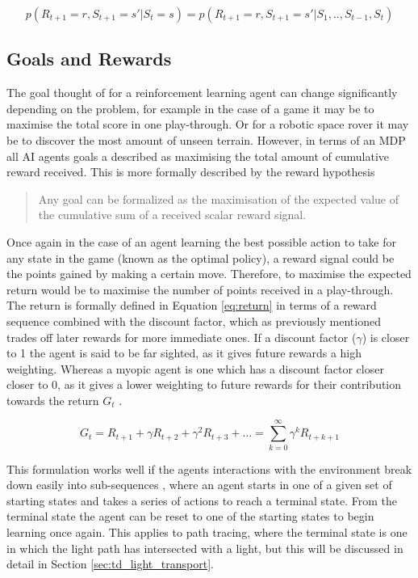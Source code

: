 \documentclass[../dissertation.tex]{subfiles}
\begin{document}
\begin{equation}
\label{eq:markov_property}
p(R_{t+1} = r, S_{t+1} = s' | S_t = s) = p(R_{t+1} = r, S_{t+1} = s' | S_1, .. , S_{t-1}, S_{t})
\end{equation}

\subsection{Goals and Rewards}
The goal thought of for a reinforcement learning agent can change significantly depending on the problem, for example in the case of a game it may be to maximise the total score in one play-through. Or for a robotic space rover it may be to discover the most amount of unseen terrain. However, in terms of an MDP all AI agents goals a described as maximising the total amount of cumulative reward received. This is more formally described by the reward hypothesis \cite{sutton2011reinforcement}

\begin{quote}
Any goal can be formalized as the maximisation of the expected value of the cumulative sum of a received scalar reward signal.
\end{quote}

Once again in the case of an agent learning the best possible action to take for any state in the game (known as the optimal policy), a reward signal could be the points gained by making a certain move. Therefore, to maximise the expected return would be to maximise the number of points received in a play-through.  The return is formally defined in Equation \ref{eq:return} in terms of a reward sequence combined with the discount factor, which as previously mentioned trades off later rewards for more immediate ones. If a discount factor ($\gamma$) is closer to 1 the agent is said to be far sighted, as it gives future rewards a high weighting. Whereas a myopic agent is one which has a discount factor closer closer to 0, as it gives a lower weighting to future rewards for their contribution towards the return $G_t$ \cite{introToRL}. 

\begin{equation}
\label{eq:return}
G_t = R_{t+1} + \gamma R_{t+2} + \gamma^2 R_{t+3} + ... = \sum^\infty_{k=0} \gamma^k R_{t+k+1}
\end{equation}

This formulation works well if the agents interactions with the environment break down easily into sub-sequences \cite{sutton2011reinforcement}, where an agent starts in one of a given set of starting states and takes a series of actions to reach a terminal state. From the terminal state the agent can be reset to one of the starting states to begin learning once again. This applies to path tracing, where the terminal state is one in which the light path has intersected with a light, but this will be discussed in detail in Section \ref{sec:td_light_transport}.
\end{document}
